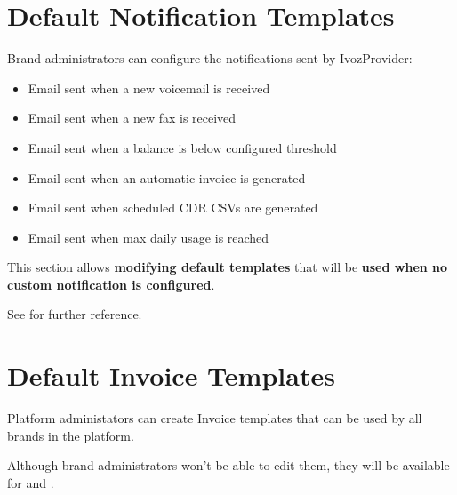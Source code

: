 \documentclass[letterpaper,10pt,english]{sphinxmanual}
\begin{document}
\section{Default Notification Templates}
\label{administration_portal/platform/default_notification_templates:id2}\label{administration_portal/platform/default_notification_templates::doc}\label{administration_portal/platform/default_notification_templates:default-notification-templates}\label{administration_portal/platform/default_notification_templates:id1}
Brand administrators can configure the notifications sent by IvozProvider:
\begin{itemize}
\item {} 
Email sent when a new voicemail is received

\item {} 
Email sent when a new fax is received

\item {} 
Email sent when a balance is below configured threshold

\item {} 
Email sent when an automatic invoice is generated

\item {} 
Email sent when scheduled CDR CSVs are generated

\item {} 
Email sent when max daily usage is reached

\end{itemize}

This section allows \textbf{modifying default templates} that will be \textbf{used when no custom notification is configured}.

See {\hyperref[administration_portal/brand/settings/notification_templates:notification\string-templates]{}} for further reference.


\section{Default Invoice Templates}
\label{administration_portal/platform/default_invoice_templates::doc}\label{administration_portal/platform/default_invoice_templates:default-invoice-templates}\label{administration_portal/platform/default_invoice_templates:id1}
Platform administators can create Invoice templates that can be used by all brands in the platform.

Although brand administrators won't be able to edit them, they will be available for {\hyperref[administration_portal/brand/invoicing/invoices:invoices]{}}
and {\hyperref[administration_portal/brand/invoicing/invoice_schedulers:invoice\string-schedulers]{}}.
\end{document}
